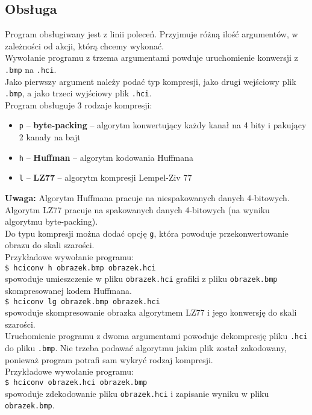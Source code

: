 \documentclass[12pt,a4paper]{article}
\newcommand{\code}[1]{\texttt{#1}}
\newcommand{\note}{\textbf{Uwaga:} }
\begin{document}
		\subsection{Obsługa}
			Program obsługiwany jest z linii poleceń. Przyjmuje różną ilość argumentów, w zależności od akcji, którą chcemy wykonać.\\
			Wywołanie programu z trzema argumentami powduje uruchomienie konwersji z \code{.bmp} na \code{.hci}.\\
			Jako pierwszy argument należy podać typ kompresji, jako drugi wejściowy plik \code{.bmp}, a jako trzeci wyjściowy plik \code{.hci}.\\
			Program obsługuje 3 rodzaje kompresji:
			\begin{itemize}
				\item \code{p} -- \textbf{byte-packing} -- algorytm konwertujący każdy kanał na 4 bity i pakujący 2 kanały na bajt
				\item \code{h} -- \textbf{Huffman} -- algorytm kodowania Huffmana
				\item \code{l} -- \textbf{LZ77} -- algorytm kompresji Lempel-Ziv 77
			\end{itemize}
			\note{
				Algorytm Huffmana pracuje na niespakowanych danych 4-bitowych.\\
				Algorytm LZ77 pracuje na spakowanych danych 4-bitowych (na wyniku algorytmu byte-packing).
			}\\
			Do typu kompresji można dodać opcję \code{g}, która powoduje przekonwertowanie obrazu do skali szarości.\\
			Przykładowe wywołanie programu:\\
			\code{\$ hciconv h obrazek.bmp obrazek.hci}\\
			spowoduje umieszczenie w pliku \code{obrazek.hci} grafiki z pliku \code{obrazek.bmp} skompresowanej kodem Huffmana.\\
			\code{\$ hciconv lg obrazek.bmp obrazek.hci}\\
			spowoduje skompresowanie obrazka algorytmem LZ77 i jego konwersję do skali szarości.\\
			Uruchomienie programu z dwoma argumentami powoduje dekompresję pliku \code{.hci} do pliku \code{.bmp}.
			Nie trzeba podawać algorytmu jakim plik został zakodowany, ponieważ program potrafi sam wykryć rodzaj kompresji.\\
			Przykładowe wywołanie programu:\\
			\code{\$ hciconv obrazek.hci obrazek.bmp}\\
			spowoduje zdekodowanie pliku \code{obrazek.hci} i zapisanie wyniku w pliku \code{obrazek.bmp}.
\end{document}
